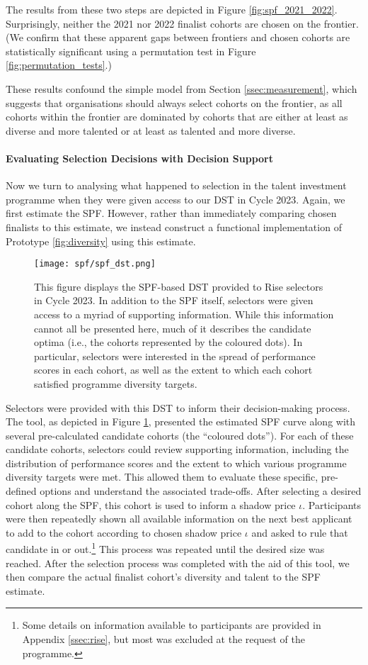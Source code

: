 The results from these two steps are depicted in Figure \ref{fig:spf_2021_2022}. Surprisingly, neither the 2021 nor 2022 finalist cohorts are chosen on the frontier. (We confirm that these apparent gaps between frontiers and chosen cohorts are statistically significant using a permutation test in Figure \ref{fig:permutation_tests}.)

These results confound the simple model from Section \ref{ssec:measurement}, which suggests that organisations should always select cohorts on the frontier, as all cohorts within the frontier are dominated by cohorts that are either at least as diverse and more talented or at least as talented and more diverse.

\paragraph{Evaluating Selection Decisions with Decision Support}
Now we turn to analysing what happened to selection in the talent investment programme when they were given access to our DST in Cycle 2023. Again, we first estimate the SPF. However, rather than immediately comparing chosen finalists to this estimate, we instead construct a functional implementation of Prototype \ref{fig:diversity} using this estimate.

\begin{figure}[htbp]
    \centering
    \caption{This figure displays the SPF-based DST provided to Rise selectors in Cycle 2023. In addition to the SPF itself, selectors were given access to a myriad of supporting information. While this information cannot all be presented here, much of it describes the candidate optima (i.e., the cohorts represented by the coloured dots). In particular, selectors were interested in the spread of performance scores in each cohort, as well as the extent to which each cohort satisfied programme diversity targets.}
    \label{fig:spf_dst}
    \texttt{[image: spf/spf\_dst.png]} 
\end{figure}

Selectors were provided with this DST to inform their decision-making process. The tool, as depicted in Figure \ref{fig:spf_dst}, presented the estimated SPF curve along with several pre-calculated candidate cohorts (the ``coloured dots''). For each of these candidate cohorts, selectors could review supporting information, including the distribution of performance scores and the extent to which various programme diversity targets were met. This allowed them to evaluate these specific, pre-defined options and understand the associated trade-offs. After selecting a desired cohort along the SPF, this cohort is used to inform a shadow price $\iota$. Participants were then repeatedly shown all available information on the next best applicant to add to the cohort according to chosen shadow price $\iota$ and asked to rule that candidate in or out.\footnote{Some details on information available to participants are provided in Appendix \ref{ssec:rise}, but most was excluded at the request of the programme.} This process was repeated until the desired size was reached. After the selection process was completed with the aid of this tool, we then compare the actual finalist cohort's diversity and talent to the SPF estimate.

